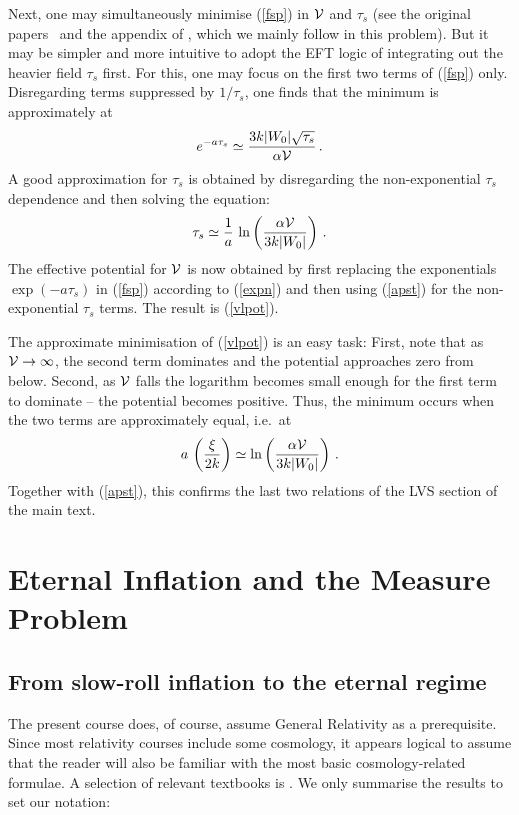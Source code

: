 \documentclass[12pt]{article}
\newcommand{\be}{\begin{equation}}
\newcommand{\ee}{\end{equation}}
\numberwithin{equation}{section}
\begin{document}
Next, one may simultaneously minimise (\ref{fsp}) in ${\cal V}$ and $\tau_s$ (see the original papers~\cite{Balasubramanian:2005zx, Conlon:2005ki} and the appendix of \cite{Hebecker:2012aw}, which we mainly follow in this problem). But it may be simpler and more intuitive to adopt the EFT logic of integrating out the heavier field $\tau_s$ first. For this, one may focus on the first two terms of (\ref{fsp}) only. Disregarding terms suppressed by $1/\tau_s$, one finds that the minimum is approximately at
\be
e^{-a\tau_s}\simeq \frac{3k |W_0|\sqrt{\tau_s}}{\alpha {\cal V}}\,.
\label{expn}
\ee
A good approximation for $\tau_s$ is obtained by disregarding the non-exponential $\tau_s$ dependence and then solving the equation:
\be
\tau_s\simeq \frac{1}{a}\,\ln\left(\frac{\alpha{\cal V}}{3k|W_0|}\right)\,.\label{apst}
\ee
The effective potential for ${\cal V}$ is now obtained by first replacing the exponentials $\exp(-a\tau_s)$ in (\ref{fsp}) according to (\ref{expn}) and then using (\ref{apst}) for the non-exponential $\tau_s$ terms. The result is (\ref{vlpot}).

The approximate minimisation of (\ref{vlpot}) is an easy task: First, note that as ${\cal V}\to\infty$, the second term dominates and the potential approaches zero from below. Second, as ${\cal V}$ falls the logarithm becomes small enough for the first term to dominate -- the potential becomes positive. Thus, the minimum occurs when the two terms are approximately equal, i.e.~at
\be
a\,\left(\frac{\xi}{2k}\right)\simeq \ln\left(\frac{\alpha{\cal V}}{3k|W_0|}\right)\,.
\ee
Together with (\ref{apst}), this confirms the last two relations of the LVS section of the main text.









\section{Eternal Inflation and the Measure Problem}\label{eimp}

\subsection{From slow-roll inflation to the eternal regime}
\label{sri}
The present course does, of course, assume General Relativity as a prerequisite. Since most relativity courses include some cosmology, it appears logical to assume that the reader will also be familiar with the most basic cosmology-related formulae. A selection of relevant textbooks is \cite{Wald:1984rg, wei, mtw, car, strau, Mukhanov:2005sc, weico, peeb, kolb}. We only summarise the results to set our notation:
\end{document}
